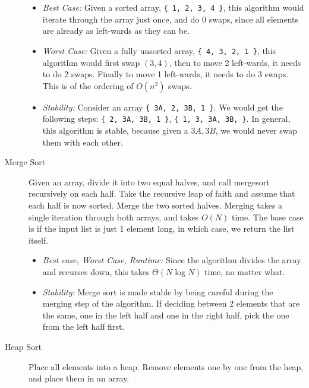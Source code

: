 \begin{solution}
\begin{description}
\begin{itemize}
\item \textit{Best Case:} Given a sorted array, \lstinline${ 1, 2, 3, 4 }$,
this algorithm would iterate through the array just once, and do 0 swaps, since
all elements are already as left-wards as they can be.
\item \textit{Worst Case:} Given a fully unsorted array,
\lstinline${ 4, 3, 2, 1 }$, this algorithm would first swap $(3, 4)$, then to
move 2 left-wards, it needs to do 2 swaps. Finally to move 1 left-wards, it
needs to do 3 swaps. This is of the ordering of $O(n^2)$ swaps.
\item \textit{Stability:} Consider an array \lstinline${ 3A, 2, 3B, 1 }$. We
would get the following steps: \lstinline${ 2, 3A, 3B, 1 }$,
\lstinline${ 1, 3, 3A, 3B, }$. In general, this algorithm is stable, because
given a $3A, 3B$, we would never swap them with each other.
\end{itemize}

\item[Merge Sort]
Given an array, divide it into two equal halves, and call mergesort recursively
on each half. Take the recursive leap of faith and assume that each half is now
sorted. Merge the two sorted halves. Merging takes a single iteration through
both arrays, and takes $O(N)$ time. The base case is if the input list is just
1 element long, in which case, we return the list itself.

\begin{itemize}
\item \textit{Best case, Worst Case, Runtime:} Since the algorithm divides the
array and recurses down, this takes $\Theta(N \log N)$ time, no matter what.
\item \textit{Stability:} Merge sort is made stable by being careful during the
merging step of the algorithm. If deciding between 2 elements that are the
same, one in the left half and one in the right half, pick the one from the
left half first.
\end{itemize}

\item[Heap Sort]
Place all elements into a heap. Remove elements one by one from the heap, and
place them in an array.


\end{description}
\end{solution}

